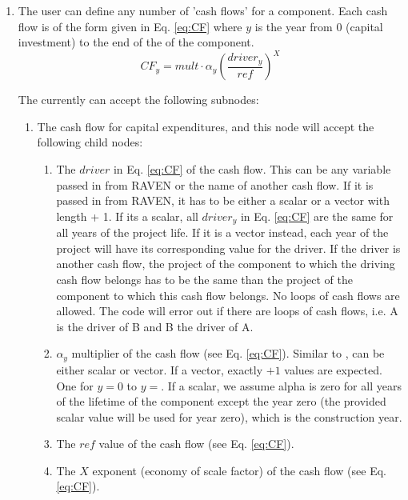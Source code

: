 \begin{enumerate}
  \item[\xmlNode{CashFlows}] The user can define any number of 'cash flows' for a component. Each cash flow is of the form given in
    Eq. \ref{eq:CF} where $y$ is the year from 0 (capital investment) to the end of the  of the component.
    \begin{equation}\label{eq:CF}
    CF_{y}=mult\cdot\alpha_{y}\left ( \frac{driver_{y}}{ref} \right )^{X}
    \end{equation}

  The  currently can accept the following subnodes:
  \begin{enumerate}
    \item[\xmlNode{Capex}] The cash flow for capital expenditures, and this node will accept the following child nodes:
      \begin{enumerate}
        \item[\xmlNode{driver}] The $driver$ in Eq. \ref{eq:CF} of the cash flow. This can be any variable passed in from RAVEN or the name
          of another cash flow. If it is passed in from RAVEN, it has to be either a scalar or a vector with length  + 1.
          If its a scalar, all $driver_{y}$ in Eq. \ref{eq:CF}  are the same for all years of the project life. If it is a vector instead, each
          year of the project  will have its corresponding value for the driver. If the driver is another
          cash flow, the project  of the component to which the driving cash flow belongs has to be the same than the project
           of the component to which this
          cash flow belongs. No loops of cash flows are allowed. The code will error out if there are loops of cash flows, i.e. A is the driver
          of B and B the driver of A.
        \item[\xmlNode{alpha}] $\alpha_{y}$ multiplier of the cash flow (see Eq. \ref{eq:CF}). Similar to , can be
          either scalar or vector. If a vector, exactly $ + 1$
          values are expected. One for $y=0$ to $y=$. If a scalar, we assume alpha is zero for all years of the lifetime
          of the component except the year zero (the provided scalar value will be used for year zero), which is the construction year.
        \item[\xmlNode{reference}] The $ref$ value of the cash flow (see Eq. \ref{eq:CF}).
        \item[\xmlNode{X}] The $X$ exponent (economy of scale factor) of the cash flow (see Eq. \ref{eq:CF}).

\end{enumerate}
\end{enumerate}
\end{enumerate}
